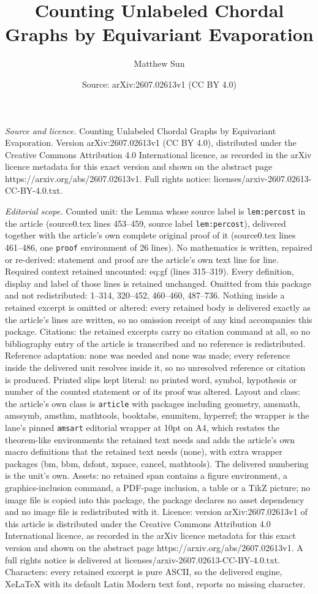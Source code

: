 \documentclass[10pt,a4paper]{amsart}
\title[Counting Unlabeled Chordal Graphs by Equivariant Evaporation]{Counting Unlabeled Chordal Graphs by Equivariant Evaporation}
\author{Matthew Sun}
\date{Source: arXiv:2607.02613v1 (CC BY 4.0)}
\begin{document}
\maketitle

\noindent\emph{Source and licence.} Counting Unlabeled Chordal Graphs by Equivariant Evaporation. Version arXiv:2607.02613v1 (CC BY 4.0), distributed under the Creative Commons Attribution 4.0 International licence, as recorded in the arXiv licence metadata for this exact version and shown on the abstract page https://arxiv.org/abs/2607.02613v1. Full rights notice: licenses/arxiv-2607.02613-CC-BY-4.0.txt.\par\smallskip

\noindent\textit{Editorial scope.} Counted unit: the Lemma whose source label is \texttt{lem:percost} in the article (source0.tex lines 453--459, source label \texttt{lem:percost}), delivered together with the article's own complete original proof of it (source0.tex lines 461--486, one \texttt{proof} environment of 26 lines). No mathematics is written, repaired or re-derived: statement and proof are the article's own text line for line. Required context retained uncounted: eq:gf (lines 315--319). Every definition, display and label of those lines is retained unchanged. Omitted from this package and not redistributed: 1--314, 320--452, 460--460, 487--736. Nothing inside a retained excerpt is omitted or altered: every retained body is delivered exactly as the article's lines are written, so no omission receipt of any kind accompanies this package. Citations: the retained excerpts carry no citation command at all, so no bibliography entry of the article is transcribed and no reference is redistributed. Reference adaptation: none was needed and none was made; every reference inside the delivered unit resolves inside it, so no unresolved reference or citation is produced. Printed slips kept literal: no printed word, symbol, hypothesis or number of the counted statement or of its proof was altered. Layout and class: the article's own class is \texttt{article} with packages including geometry, amsmath, amssymb, amsthm, mathtools, booktabs, enumitem, hyperref; the wrapper is the lane's pinned \texttt{amsart} editorial wrapper at 10pt on A4, which restates the theorem-like environments the retained text needs and adds the article's own macro definitions that the retained text needs (none), with extra wrapper packages (bm, bbm, dsfont, xspace, cancel, mathtools). The delivered numbering is the unit's own. Assets: no retained span contains a figure environment, a graphics-inclusion command, a PDF-page inclusion, a table or a TikZ picture; no image file is copied into this package, the package declares no asset dependency and no image file is redistributed with it. Licence: version arXiv:2607.02613v1 of this article is distributed under the Creative Commons Attribution 4.0 International licence, as recorded in the arXiv licence metadata for this exact version and shown on the abstract page https://arxiv.org/abs/2607.02613v1. A full rights notice is delivered at licenses/arxiv-2607.02613-CC-BY-4.0.txt. Characters: every retained excerpt is pure ASCII, so the delivered engine, XeLaTeX with its default Latin Modern text font, reports no missing character.
\end{document}
